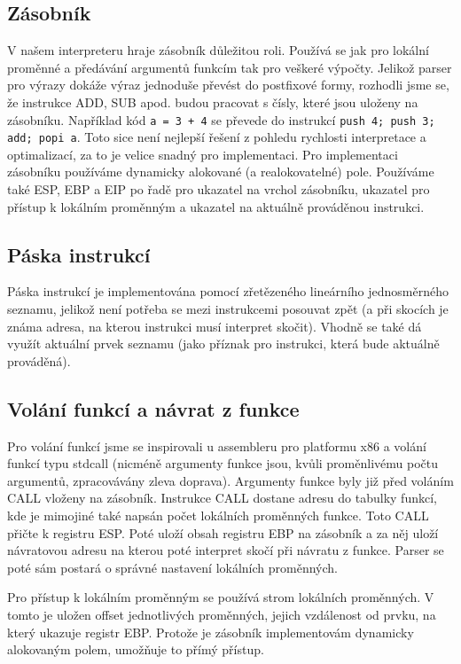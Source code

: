 \documentclass[a4paper,11pt,titlepage]{article}
\begin{document}
\subsection{Zásobník}
V našem interpreteru hraje zásobník důležitou roli. Používá se jak pro lokální proměnné a předávání argumentů funkcím tak pro veškeré výpočty. Jelikož parser pro výrazy dokáže výraz jednoduše převést do postfixové formy, rozhodli jsme se, že instrukce ADD, SUB apod. budou pracovat s čísly, které jsou uloženy na zásobníku. Například kód {\tt a = 3 + 4} se převede do instrukcí {\tt push 4; push 3; add; popi a}. Toto sice není nejlepší řešení z pohledu rychlosti interpretace a optimalizací, za to je velice snadný pro implementaci. Pro implementaci zásobníku používáme dynamicky alokované (a realokovatelné) pole. Používáme také  ESP, EBP a EIP po řadě pro ukazatel na vrchol zásobníku, ukazatel pro přístup k lokálním proměnným a ukazatel na aktuálně prováděnou instrukci.
\subsection{Páska instrukcí}
Páska instrukcí je implementována pomocí zřetězeného lineárního jedno\-směr\-né\-ho seznamu, jelikož není potřeba se mezi instrukcemi posouvat zpět (a při skocích je známa adresa, na kterou instrukci musí interpret skočit). Vhodně se také dá využít aktuální prvek seznamu (jako příznak pro instrukci, která bude aktuálně prováděná).
\subsection{Volání funkcí a návrat z funkce}
Pro volání funkcí jsme se inspirovali u assembleru pro platformu x86 a volání funkcí typu stdcall (nicméně argumenty funkce jsou, kvůli proměnlivému počtu argumentů, zpracovávány zleva doprava). Argumenty funkce byly již před voláním CALL vloženy na zásobník. Instrukce CALL dostane adresu do tabulky funkcí, kde je mimojiné také napsán počet lokálních pro\-měn\-ných funkce. Toto CALL přičte k registru ESP. Poté uloží obsah registru EBP na zásobník a za něj uloží návratovou adresu na kterou poté interpret skočí při návratu z funkce. Parser se poté sám postará o správné nastavení lokálních proměnných.


Pro přístup k lokálním proměnným se používá strom lokálních pro\-měn\-ných. V tomto je uložen offset jednotlivých proměnných, jejich vzdálenost od prvku, na který ukazuje registr EBP. Protože je zásobník implementovám dynamicky alokovaným polem, umožňuje to přímý přístup.
\end{document}
